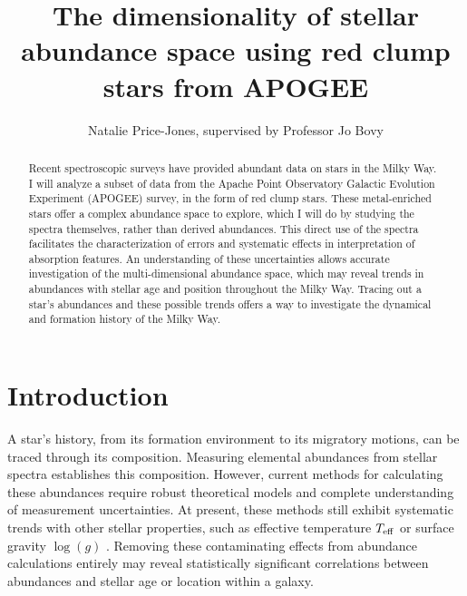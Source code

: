 \documentclass[preprint]{aastex}
\begin{document}
\title{The dimensionality of stellar abundance space using red clump stars from APOGEE}
\author{Natalie Price-Jones, supervised by Professor Jo Bovy}

\begin{abstract}
Recent spectroscopic surveys have provided abundant data on stars in the Milky Way. I will analyze a subset of data from the Apache Point Observatory Galactic Evolution Experiment (APOGEE) survey, in the form of red clump stars. These metal-enriched stars offer a complex abundance space to explore, which I will do by studying the spectra themselves, rather than derived abundances. This direct use of the spectra facilitates the characterization of errors and systematic effects in interpretation of absorption features. An understanding of these uncertainties allows accurate investigation of the multi-dimensional abundance space, which may reveal trends in abundances with stellar age and position throughout the Milky Way. Tracing out a star's abundances and these possible trends offers a way to investigate the dynamical and formation history of the Milky Way.


\end{abstract}

\section{Introduction}
\label{sec:back}
A star's history, from its formation environment to its migratory motions, can be traced through its composition. Measuring elemental abundances from stellar spectra establishes this composition. However, current methods for calculating these abundances require robust theoretical models and complete understanding of measurement uncertainties. At present, these methods still exhibit systematic trends with other stellar properties, such as effective temperature $T_{\rm eff}$ or surface gravity $\log(g)$ \citep{holtzman2015}. Removing these contaminating effects from abundance calculations entirely may reveal statistically significant correlations between abundances and stellar age or location within a galaxy. 
\end{document}

